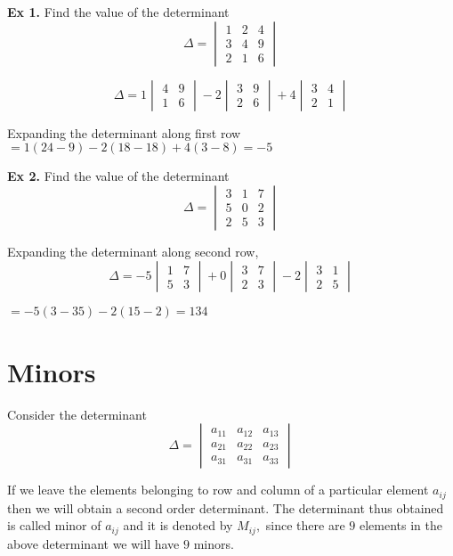 \textbf{Ex 1.} Find the value of the determinant $$\Delta = \begin{vmatrix}1 & 2 & 4\\3 & 4 & 9\\2 & 1 & 6\end{vmatrix}$$

$$\Delta = 1\begin{vmatrix}4 & 9\\1 & 6\end{vmatrix} -2\begin{vmatrix}3 & 9\\2 & 6\end{vmatrix} + 4\begin{vmatrix}3 & 4\\2 &
  1\end{vmatrix}$$

Expanding the determinant along first row $= 1(24 -9) - 2(18 - 18) + 4(3 - 8) = -5$

\textbf{Ex 2.} Find the value of the determinant $$\Delta = \begin{vmatrix}3 & 1 & 7\\5 & 0 & 2\\2 & 5 & 3\end{vmatrix}$$

Expanding the determinant along second row, $$\Delta = -5\begin{vmatrix}1 & 7\\5 & 3\end{vmatrix} + 0\begin{vmatrix}3 & 7\\2 & 3\end{vmatrix} -2\begin{vmatrix}3 & 1\\2 & 5\end{vmatrix}$$

$= -5(3 - 35) -2(15 -2) = 134$

\section{Minors}
Consider the determinant $$\Delta = \begin{vmatrix}a_{11} & a_{12} & a_{13}\\a_{21} & a_{22} & a_{23}\\a_{31} & a_{31} &
  a_{33}\end{vmatrix}$$

If we leave the elements belonging to row and column of a particular element $a_{ij}$ then we will obtain a second order
determinant. The determinant thus obtained is called minor of $a_{ij}$ and it is denoted by $M_{ij},$ since there are $9$ elements
in the above determinant we will have $9$ minors.

